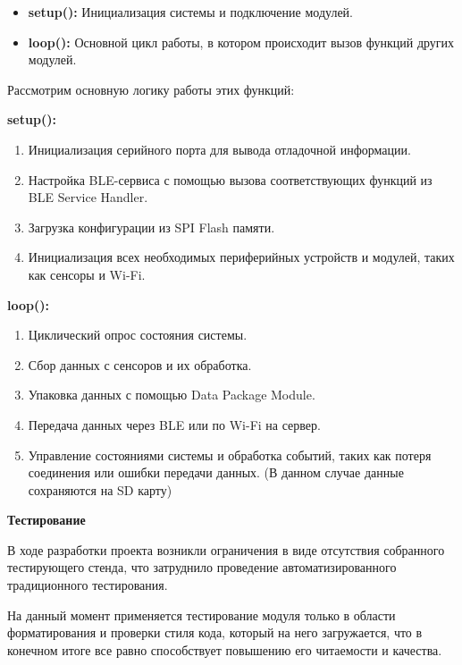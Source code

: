 \documentclass[12pt, russian]{extarticle}
\begin{document}
\begin{spacing}{1.5}
\begin{itemize}
    \item \textbf{setup():} Инициализация системы и подключение модулей.
    \item \textbf{loop():} Основной цикл работы, в котором происходит вызов функций других модулей.
\end{itemize}

Рассмотрим основную логику работы этих функций:

\par \textbf{setup():}

\begin{enumerate}
    \item Инициализация серийного порта для вывода отладочной информации.
    \item Настройка BLE-сервиса с помощью вызова соответствующих функций из BLE Service Handler.
    \item Загрузка конфигурации из SPI Flash памяти.
    \item Инициализация всех необходимых периферийных устройств и модулей, таких как сенсоры и Wi-Fi.
\end{enumerate}

\par \textbf{loop():}

\begin{enumerate}
    \item Циклический опрос состояния системы.
    \item Сбор данных с сенсоров и их обработка.
    \item Упаковка данных с помощью Data Package Module.
    \item Передача данных через BLE или по Wi-Fi на сервер.
    \item Управление состояниями системы и обработка событий, таких как потеря соединения или ошибки передачи данных. (В данном случае данные сохраняются на SD карту)
\end{enumerate}

\par \noindent \textbf{Тестирование}

В ходе разработки проекта возникли ограничения в виде отсутствия собранного тестирующего стенда, что затруднило проведение автоматизированного традиционного тестирования.

На данный момент применяется тестирование модуля только в области форматирования и проверки стиля кода, который на него загружается, что в конечном итоге все равно способствует повышению его читаемости и качества.


\end{spacing}
\end{document}
